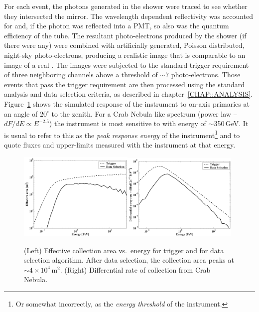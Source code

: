 For each event, the \Cerenkov photons generated in the shower were
traced to see whether they intersected the mirror. The wavelength
dependent reflectivity was accounted for and, if the photon was
reflected into a PMT, so also was the quantum efficiency of the tube.
The resultant photo-electrons produced by the shower (if there were
any) were combined with artificially generated, Poisson distributed,
night-sky photo-electrons, producing a realistic image that is
comparable to an image of a real \Grayc. The images were subjected to
the standard trigger requirement of three neighboring channels above a
threshold of $\sim7$ photo-electrons. Those events that pass the
trigger requirement are then processed using the standard analysis and
data selection criteria, as described in chapter~\ref{CHAP::ANALYSIS}.
Figure~\ref{FIG::TECHNIQUE::AREA_DRDE} shows the simulated response of
the instrument to on-axis \Gray primaries at an angle of $20^\circ$
to the zenith. For a Crab Nebula like spectrum (power law --
$dF/dE\propto E^{-2.5}$) the instrument is most sensitive to \Grays
with energy of $\sim$350\,GeV. It is usual to refer to this as the
\textit{peak response energy} of the instrument\footnote{Or somewhat
incorrectly, as the \textit{energy threshold} of the instrument.} and
to quote fluxes and upper-limits measured with the instrument at that
energy.

\begin{figure}[t]
\centerline{\includegraphics[angle=270,width=0.49\textwidth]{plots/chap-technique/detector_response_area.pdf}\includegraphics[angle=270,width=0.49\textwidth]{plots/chap-technique/detector_response_drde.pdf}}
\caption{\label{FIG::TECHNIQUE::AREA_DRDE} (Left) Effective
collection area vs.\ energy for trigger and for data selection
algorithm. After data selection, the collection area peaks at
$\sim4\times10^4$\,m$^2$. (Right) Differential rate of \Grays
collection from Crab Nebula. } \end{figure}

